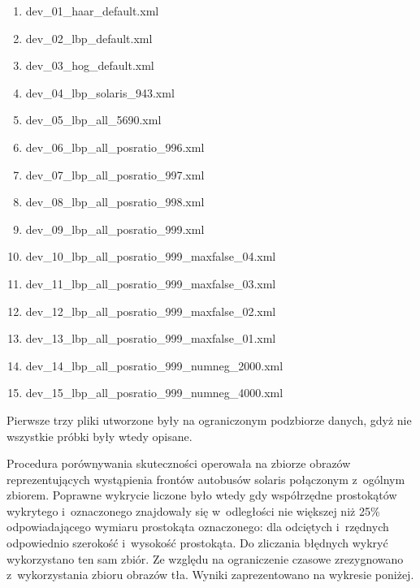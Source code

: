 \begin{enumerate}
\item dev\_01\_haar\_default.xml
\item dev\_02\_lbp\_default.xml
\item dev\_03\_hog\_default.xml
\item dev\_04\_lbp\_solaris\_943.xml
\item dev\_05\_lbp\_all\_5690.xml
\item dev\_06\_lbp\_all\_posratio\_996.xml
\item dev\_07\_lbp\_all\_posratio\_997.xml
\item dev\_08\_lbp\_all\_posratio\_998.xml
\item dev\_09\_lbp\_all\_posratio\_999.xml
\item dev\_10\_lbp\_all\_posratio\_999\_maxfalse\_04.xml
\item dev\_11\_lbp\_all\_posratio\_999\_maxfalse\_03.xml
\item dev\_12\_lbp\_all\_posratio\_999\_maxfalse\_02.xml
\item dev\_13\_lbp\_all\_posratio\_999\_maxfalse\_01.xml
\item dev\_14\_lbp\_all\_posratio\_999\_numneg\_2000.xml
\item dev\_15\_lbp\_all\_posratio\_999\_numneg\_4000.xml
\end{enumerate}

Pierwsze trzy pliki utworzone były na ograniczonym podzbiorze danych, gdyż
nie wszystkie próbki były wtedy opisane.

Procedura porównywania skuteczności operowała na zbiorze obrazów
reprezentujących wystąpienia frontów autobusów solaris połączonym
z~ogólnym zbiorem. Poprawne
wykrycie liczone było wtedy gdy współrzędne prostokątów wykrytego
i~oznaczonego znajdowały się w~odległości nie większej niż 25\% odpowiadającego
wymiaru prostokąta oznaczonego: dla odciętych i~rzędnych odpowiednio szerokość
i~wysokość prostokąta. Do zliczania błędnych wykryć wykorzystano ten sam zbiór.
Ze względu na ograniczenie czasowe zrezygnowano z~wykorzystania zbioru
obrazów tła. Wyniki zaprezentowano na wykresie poniżej.

\begin{center}
\end{center}


